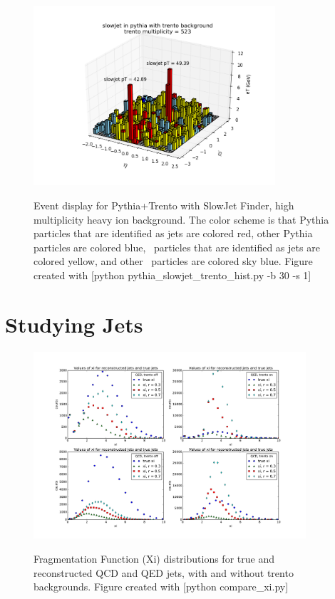 \documentclass[11pt]{article}
\begin{document}
\begin{figure}[h]
\begin{center}
\includegraphics[width=0.8\textwidth]{pythia_slowjet_trento_hist2.png}
\label{fig_label}
\caption{Event display for Pythia+Trento with SlowJet Finder, high multiplicity heavy ion background.  The color scheme is that Pythia particles that are identified as jets are colored red, other Pythia particles are colored blue, \trento\ particles that are identified as jets are colored yellow, and other \trento\ particles are colored sky blue. Figure created with [python pythia\_slowjet\_trento\_hist.py -b 30 -s 1]}
\end{center}
\end{figure}

\section{Studying Jets}
%
%

\begin{figure}[h]
\begin{center}
\includegraphics[width=0.9\textwidth]{compare_xi.pdf}
\label{fig_label}
\caption{Fragmentation Function (Xi) distributions for true and reconstructed QCD and QED jets, with and without trento backgrounds.  Figure created with [python compare\_xi.py]}
\end{center}
\end{figure}

%
%
\end{document}
